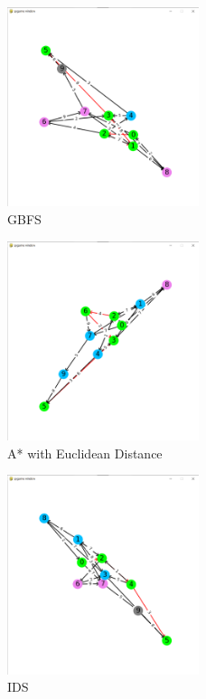 \begin{figure}[h!]
    \centering
    \includegraphics[width=0.5\textwidth]{result/testcase4/greedy.png}
    \caption{GBFS}
\end{figure}
\begin{figure}[h!]
    \centering
    \includegraphics[width=0.5\textwidth]{result/testcase4/astar.png}
    \caption{A* with Euclidean Distance}
\end{figure}
\begin{figure}[h!]
    \centering
    \includegraphics[width=0.5\textwidth]{result/testcase4/ids.png}
    \caption{IDS}
\end{figure}
